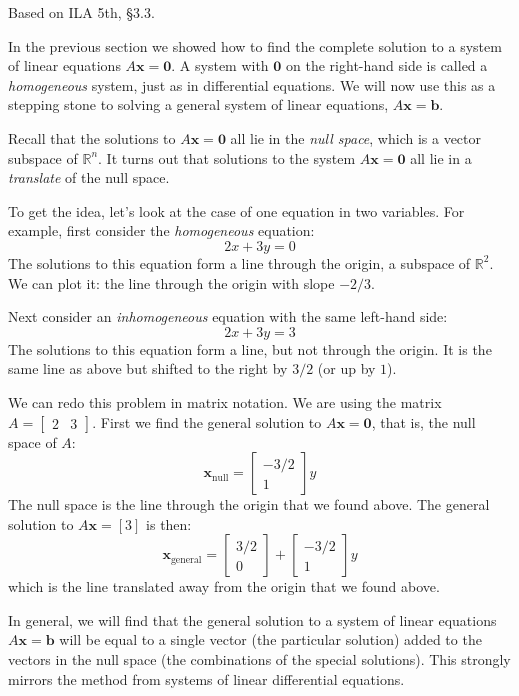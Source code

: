 \documentclass[11pt,oneside]{amsbook}
\newcommand{\R}{\mathbb R}
\theoremstyle{definition}
\theoremstyle{plain}
\theoremstyle{definition}
\theoremstyle{remark}
\numberwithin{equation}{section}
\numberwithin{figure}{section}
\begin{document}
Based on ILA 5th, \S 3.3.

In the previous section we showed how to find the complete solution to a system of linear equations $A\mathbf{x}=\mathbf{0}$. A system with $\mathbf{0}$ on the right-hand side is called a \emph{homogeneous} system, just as in differential equations. We will now use this as a stepping stone to solving a general system of linear equations, $A\mathbf{x}=\mathbf{b}$.

Recall that the solutions to $A\mathbf{x}=\mathbf{0}$ all lie in the \emph{null space}, which is a vector subspace of $\R^n$. It turns out that solutions to the system $A\mathbf{x}=\mathbf{0}$ all lie in a \emph{translate} of the null space.

To get the idea, let's look at the case of one equation in two variables. For example, first consider the \emph{homogeneous} equation:
\[2x+3y=0
\]
The solutions to this equation form a line through the origin, a subspace of $\R^2$. We can plot it: the line through the origin with slope $-2/3$.

Next consider an \emph{inhomogeneous} equation with the same left-hand side:
\[2x+3y=3
\]
The solutions to this equation form a line, but not through the origin. It is the same line as above but shifted to the right by $3/2$ (or up by $1$).

We can redo this problem in matrix notation. We are using the matrix $A=\begin{bmatrix}2&3\end{bmatrix}$. First we find the general solution to $A\mathbf{x}=\mathbf{0}$, that is, the null space of $A$:
\[\mathbf{x}_{\mathrm{null}}
  =\begin{bmatrix}-3/2\\1\end{bmatrix}y
\]
The null space is the line through the origin that we found above. The general solution to $A\mathbf{x}=[3]$ is then:
\[\mathbf{x}_{\mathrm{general}}
  =\begin{bmatrix}3/2\\0\end{bmatrix}
  +\begin{bmatrix}-3/2\\1\end{bmatrix}y
\]
which is the line translated away from the origin that we found above.

In general, we will find that the general solution to a system of linear equations $A\mathbf{x}=\mathbf{b}$ will be equal to a single vector (the particular solution) added to the vectors in the null space (the combinations of the special solutions). This strongly mirrors the method from systems of linear differential equations.
\end{document}
